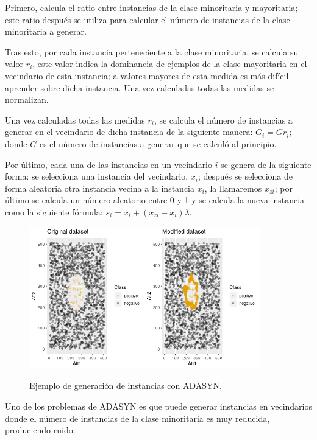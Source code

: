 Primero, calcula el ratio entre instancias de la clase minoritaria y mayoritaria; este ratio después se utiliza para calcular el número de instancias de la clase minoritaria a generar.\newline

Tras esto, por cada instancia perteneciente a la clase minoritaria, se calcula su valor $r_i$, este valor indica la dominancia de ejemplos de la clase mayoritaria en el vecindario de esta instancia; a valores mayores de esta medida es más difícil aprender sobre dicha instancia. Una vez calculadas todas las medidas se normalizan.\newline

Una vez calculadas todas las medidas $r_i$, se calcula el número de instancias a generar en el vecindario de dicha instancia de la siguiente manera: $G_i = G r_i$; donde $G$ es el número de instancias a generar que se calculó al principio.\newline
\newpage

Por último, cada una de las instancias en un vecindario $i$ se genera de la siguiente forma: se selecciona una instancia del vecindario, $x_i$; después se selecciona de forma aleatoria otra instancia vecina a la instancia $x_i$, la llamaremos $x_{zi}$; por último se calcula un número aleatorio entre 0 y 1 y se calcula la nueva instancia como la siguiente fórmula: $ s_i = x_i + (x_{zi}-x_i)\lambda$.\newline

\begin{figure}[h]
	\centering
	\includegraphics[width=100mm]{imagenes/ADASYN_comparison.png}
	\label{fig:14}
	\caption{Ejemplo de generación de instancias con ADASYN.}
\end{figure}
\verticalspace

Uno de los problemas de ADASYN es que puede generar instancias en vecindarios donde el número de instancias de la clase minoritaria es muy reducida, produciendo ruido.
